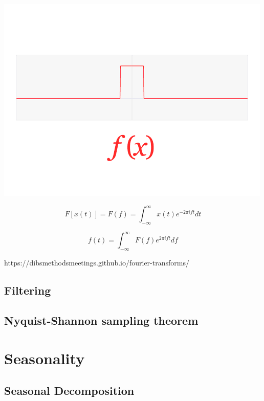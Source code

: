 \documentclass[
  letterpaper,
  DIV=11,
  numbers=noendperiod,
  oneside]{scrreprt}
\begin{document}
\includegraphics{frequency/Continuous_Fourier_transform_of_rect_and_sinc_functions.gif}

\[
F[x(t)] = F(f) = \int_{-\infty}^{\infty}x(t)e^{-2\pi i f t}dt
\]

\[
f(t) = \int_{-\infty}^{\infty}F(f)e^{2\pi i f t}df
\]

https://dibsmethodsmeetings.github.io/fourier-transforms/

\hypertarget{filtering}{%
\chapter{Filtering}\label{filtering}}

\hypertarget{nyquist-shannon-sampling-theorem}{%
\chapter{Nyquist-Shannon sampling
theorem}\label{nyquist-shannon-sampling-theorem}}

\part{Seasonality}

\hypertarget{seasonal-decomposition}{%
\chapter{Seasonal Decomposition}\label{seasonal-decomposition}}
\end{document}
